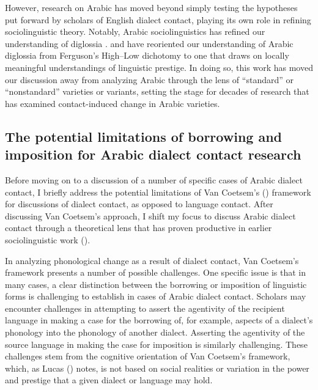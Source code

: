 \documentclass[output=paper]{langsci/langscibook}
\begin{document}
  However, research on Arabic has moved beyond simply testing the hypotheses put forward by scholars of English dialect contact, playing its own role in refining sociolinguistic theory. Notably, Arabic sociolinguistics has refined our understanding of diglossia \citep{Ferguson1959}. \citet{Ibrahim1986} and \citet{Haeri2000} have reoriented our understanding of Arabic diglossia from Ferguson’s High–Low dichotomy to one that draws on locally meaningful understandings of linguistic prestige. In doing so, this work has moved our discussion away from analyzing Arabic through the lens of “standard” or “nonstandard” varieties or variants, setting the stage for decades of research that has examined contact-induced change in Arabic varieties.


 
 \subsection{The potential limitations of borrowing and imposition for Arabic dialect contact research}


Before moving on to a discussion of a number of specific cases of Arabic dialect contact, I briefly address the potential limitations of Van Coetsem’s (\citeyear{VanCoetsem1988,VanCoetsem2000}) framework for discussions of dialect contact, as opposed to language contact. After discussing Van Coetsem’s approach, I shift my focus to discuss Arabic dialect contact through a theoretical lens that has proven productive in earlier sociolinguistic work (\citealt{Trudgill1986,Trudgill2004}). 

  In analyzing phonological change as a result of dialect contact, Van Coetsem’s framework presents a number of possible challenges. One specific issue is that in many cases, a clear distinction between the borrowing or imposition of linguistic forms is challenging to establish in cases of Arabic dialect contact. Scholars may encounter challenges in attempting to assert the agentivity of the recipient language in making a case for the borrowing of, for example, aspects of a dialect’s phonology into the phonology of another dialect. Asserting the agentivity of the source language in making the case for imposition is similarly challenging. These challenges stem from the cognitive orientation of Van Coetsem’s framework, which, as Lucas (\citeyear[521]{Lucas2015}) notes, is not based on social realities or variation in the power and prestige that a given dialect or language may hold. 
\end{document}
